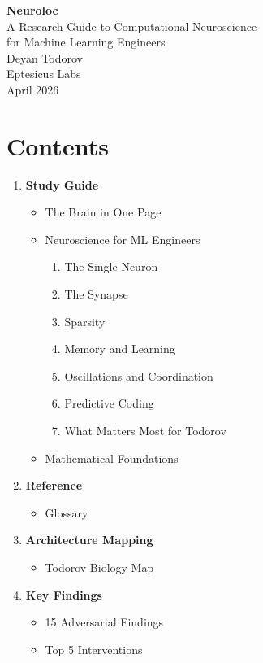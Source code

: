 \documentclass[11pt,a4paper]{article}
\begin{document}

\thispagestyle{empty}
\vspace*{6cm}
\begin{center}
{\Huge\bfseries Neuroloc}\\[0.8cm]
{\Large A Research Guide to Computational Neuroscience\\[0.3cm]
for Machine Learning Engineers}\\[2cm]
{\large Deyan Todorov}\\[0.3cm]
{\large Eptesicus Labs}\\[2cm]
{\normalsize April 2026}
\end{center}
\newpage


\thispagestyle{empty}
\section*{Contents}

\begin{enumerate}[label=\Roman*.]
  \item \textbf{Study Guide}
    \begin{itemize}
      \item The Brain in One Page
      \item Neuroscience for ML Engineers
        \begin{enumerate}[label=Part \arabic*:]
          \item The Single Neuron
          \item The Synapse
          \item Sparsity
          \item Memory and Learning
          \item Oscillations and Coordination
          \item Predictive Coding
          \item What Matters Most for Todorov
        \end{enumerate}
      \item Mathematical Foundations
    \end{itemize}
  \item \textbf{Reference}
    \begin{itemize}
      \item Glossary
    \end{itemize}
  \item \textbf{Architecture Mapping}
    \begin{itemize}
      \item Todorov Biology Map
    \end{itemize}
  \item \textbf{Key Findings}
    \begin{itemize}
      \item 15 Adversarial Findings
      \item Top 5 Interventions
    \end{itemize}
\end{enumerate}
\newpage
\end{document}
